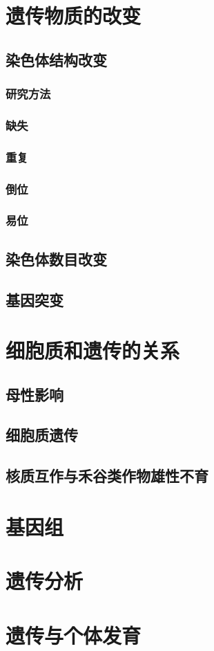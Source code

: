 \section{遗传物质的改变}

\subsection{染色体结构改变}

\subsubsection{研究方法}

\subsubsection{缺失}

\subsubsection{重复}

\subsubsection{倒位}

\subsubsection{易位}

\subsection{染色体数目改变}

\subsection{基因突变}

\section{细胞质和遗传的关系}

\subsection{母性影响}

\subsection{细胞质遗传}

\subsection{核质互作与禾谷类作物雄性不育}



\section{基因组}

\section{遗传分析}

\section{遗传与个体发育}

